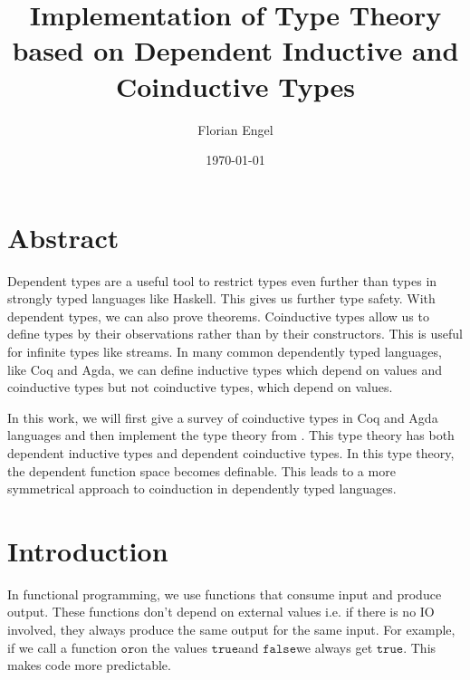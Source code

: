 \documentclass[a4paper,cleardoubleempty,BCOR1cm]{scrbook}
\author{Florian Engel}
\date{\today}
\title{Implementation of Type Theory based on Dependent Inductive and Coinductive Types}
\begin{document}
\maketitle


\chapter*{Abstract}
  Dependent types are a useful tool to restrict types even further than types in
  strongly typed languages like Haskell. This gives us further type safety. With
  dependent types, we can also prove theorems. Coinductive types allow us to define types by
  their observations rather than by their constructors. This is useful for
  infinite types like streams. In many common dependently typed languages, like
  Coq and Agda, we can define inductive types which depend on values and
  coinductive types but not coinductive types, which depend on values.

In this work, we will first give a survey of coinductive types in Coq and Agda
languages and then implement the type theory from \cite{basold2016type}. This
type theory has both dependent inductive types and dependent coinductive
types. In this type theory, the dependent function space becomes definable.
This leads to a more symmetrical approach to coinduction in dependently typed
languages.

\setcounter{tocdepth}{2}
\tableofcontents

\chapter{Introduction}
\label{sec:orgd9226af}
In functional programming, we use functions that consume input and produce
output. These functions don't depend on external values i.e. if there is no IO
involved, they always produce the same output for the same input. For
example, if we call a function $\mathtt{or}$\;on the values $\mathtt{true}$\;and $\mathtt{false}$\;we always
get $\mathtt{true}$. This makes code more predictable.
\end{document}
